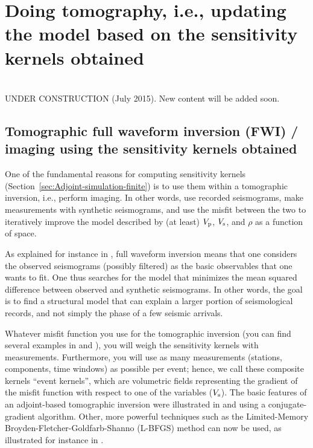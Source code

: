 \chapter[Doing tomography based on the sensitivity kernels obtained]{Doing tomography, i.e., updating the model based on the sensitivity kernels obtained}\label{cha:tomo}

\\

UNDER CONSTRUCTION (July 2015). New content will be added soon.

\section{Tomographic full waveform inversion (FWI) / imaging using the sensitivity kernels obtained}

One of the fundamental reasons for computing sensitivity kernels (Section~\ref{sec:Adjoint-simulation-finite})
is to use them within a tomographic inversion, i.e., perform imaging. In other words, use
recorded seismograms, make measurements with synthetic seismograms,
and use the misfit between the two to iteratively improve the model
described by (at least) $V_{{\rm p}}$, $V_{{\rm s}}$, and $\rho$ as a function of space.

As explained for instance in \cite{MoChKoWa15},
full waveform inversion means that one considers the observed seismograms (possibly filtered) as the
basic observables that one wants to fit. One thus searches for the model that minimizes the mean squared difference between observed
and synthetic seismograms. In other words, the goal is to find a structural model that can explain a larger portion
of seismological records, and not simply the phase of a few seismic arrivals.

Whatever misfit function you use for the tomographic inversion (you can find several
examples in \citet{TrKoLi08} and \citet{TrTaLi05}), you will weigh
the sensitivity kernels with measurements. Furthermore, you will use
as many measurements (stations, components, time windows) as possible
per event; hence, we call these composite kernels ``event kernels'',
which are volumetric fields representing the gradient of the misfit
function with respect to one of the variables (\eg $V_{{\rm s}}$).
The basic features of an adjoint-based tomographic inversion were
illustrated in \citet{TrKoLi08} and \citet{TaLiTr07} using a conjugate-gradient algorithm.
Other, more powerful techniques such as the Limited-Memory Broyden-Fletcher-Goldfarb-Shanno (L-BFGS) method can now be used,
as illustrated for instance in \cite{MoChKoWa15}.

